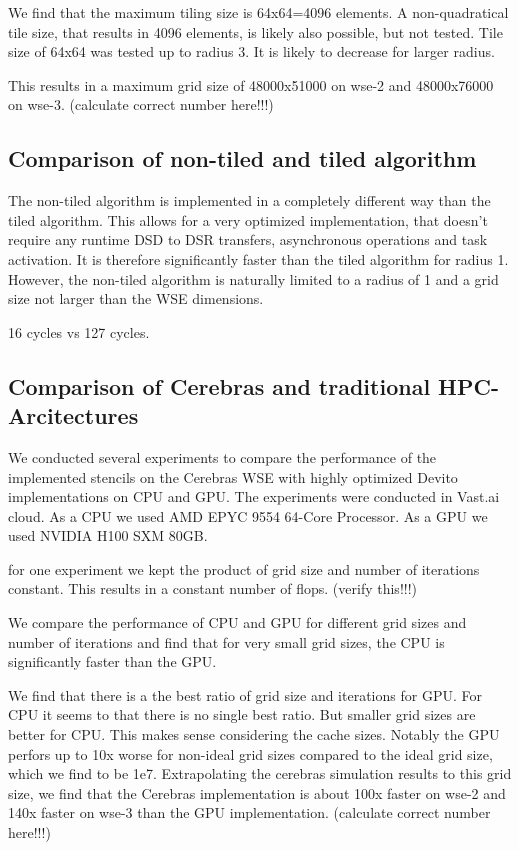 \documentclass{article}
\begin{document}
We find that the maximum tiling size  is 64x64=4096 elements.
A non-quadratical tile size, that results in 4096 elements, is likely also possible, but not tested.
Tile size of 64x64 was tested up to radius 3. It is likely to decrease for larger radius.

This results in a maximum grid size of 48000x51000 on wse-2 and 48000x76000 on wse-3. (calculate correct number here!!!)

\subsection{Comparison of non-tiled and tiled algorithm}

The non-tiled algorithm is implemented in a completely different way than the tiled algorithm.
This allows for a very optimized implementation, that doesn't require any runtime DSD to DSR transfers, asynchronous operations and task activation.
It is therefore significantly faster than the tiled algorithm for radius 1.
However, the non-tiled algorithm is naturally limited to a radius of 1 and a grid size not larger than the WSE dimensions.

16 cycles vs 127 cycles.

\subsection{Comparison of Cerebras and traditional HPC-Arcitectures}
We conducted several experiments to compare the performance of the implemented stencils on the Cerebras WSE with highly optimized Devito implementations on CPU and GPU. The experiments were conducted in Vast.ai cloud.
As a CPU we used AMD EPYC 9554 64-Core Processor.
As a GPU we used NVIDIA H100 SXM 80GB.

for one experiment we kept the product of grid size and number of iterations constant. This results in a constant number of flops. (verify this!!!)

We compare the performance of CPU and GPU for different grid sizes and number of iterations and find that for very small grid sizes, the CPU is significantly faster than the GPU.

We find that there is a the best ratio of grid size and iterations for GPU. For CPU it seems to that there is no single best ratio.
But smaller grid sizes are better for CPU. This makes sense considering the cache sizes.
Notably the GPU perfors up to 10x worse for non-ideal grid sizes compared to the ideal grid size, which we find to be 1e7.
Extrapolating the cerebras simulation results to this grid size, we find that the Cerebras implementation is about 100x faster on wse-2 and 140x faster on wse-3 than the GPU implementation. (calculate correct number here!!!)
\end{document}
